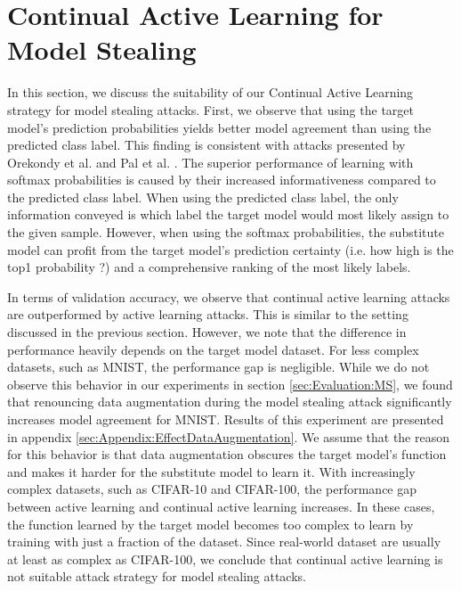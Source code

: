 \section{Continual Active Learning for Model Stealing}
\label{sec:Discussion:ModelStealing}
In this section, we discuss the suitability of our Continual Active Learning strategy for model stealing attacks. First, we observe that using the target model's
prediction probabilities yields better model agreement than using the predicted class label. This finding is consistent with attacks presented by Orekondy et al.
\cite{orekondy2019knockoff} and Pal et al. \cite{pal2020activethief}. The superior performance of learning with softmax probabilities is caused by their increased
informativeness compared to the predicted class label. When using the predicted class label, the only information conveyed is which label the target model would 
most likely assign to the given sample. However, when using the softmax probabilities, the substitute model can profit from the target model's prediction certainty
(i.e. how high is the top1 probability ?) and a comprehensive ranking of the most likely labels. \par
In terms of validation accuracy, we observe that continual active learning attacks are outperformed by active learning attacks. This is similar to the setting
discussed in the previous section. However, we note that the difference in performance heavily depends on the target model dataset. For less complex datasets,
such as MNIST, the performance gap is negligible. While we do not observe this behavior in our experiments in section \ref{sec:Evaluation:MS}, we found that
renouncing data augmentation during the model stealing attack significantly increases model agreement for MNIST. Results of this experiment are presented in
appendix \ref{sec:Appendix:EffectDataAugmentation}. We assume that the reason for this behavior is that data augmentation obscures the target model's function
and makes it harder for the substitute model to learn it. With increasingly complex datasets, such as CIFAR-10 and CIFAR-100, the performance gap between
active learning and continual active learning increases. In these cases, the function learned by the target model becomes too complex to learn by training with
just a fraction of the dataset. Since real-world dataset are usually at least as complex as CIFAR-100, we conclude that continual active learning is not suitable
attack strategy for model stealing attacks.
